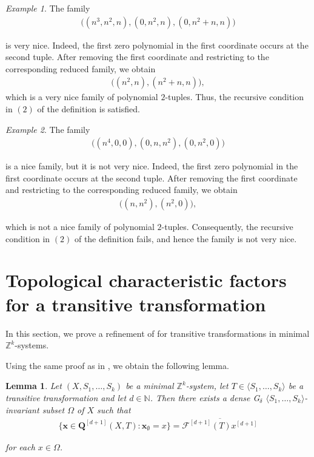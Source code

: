 \documentclass[11pt,reqno]{amsart}
\newcommand{\Z}{\mathbb{Z}}
\newcommand{\N}{\mathbb{N}}
\newcommand{\bQ}{\bm{Q}}
\newcommand{\bx}{{\boldsymbol x}}
\newcommand{\cF}{{\mathcal F}}
\newtheorem{lemma}[lemma]{Lemma}
\theoremstyle{definition}
\theoremstyle{remark}
\newtheorem{example}[example]{Example}
\begin{document}
\begin{example}
    The family \begin{align*}
    \big( (n^3,n^2,n),(0,n^2,n),(0,n^2+n,n) \big)
\end{align*}

is very nice. Indeed, the first zero polynomial in the first coordinate occurs at the second tuple. After removing the first coordinate and restricting to the corresponding reduced family, we obtain
\begin{align*}
    \big(
        (n^2,n),
        (n^2+n,n)
    \big),
\end{align*}
which is a very nice family of polynomial $2$-tuples. Thus, the recursive condition in $(2)$ of the definition is satisfied.
\end{example}

\begin{example}
    The family\begin{align*}
        \big( (n^4,0,0),(0,n,n^2),(0,n^2,0) \big)
    \end{align*}

    is a nice family, but it is not very nice. Indeed, the first zero polynomial in the first coordinate occurs at the second tuple. After removing the first coordinate and restricting to the corresponding reduced family, we obtain\begin{align*}
        \big( (n,n^2),(n^2,0)\big),
    \end{align*}

    which is not a nice family of polynomial $2$-tuples. Consequently, the recursive condition in $(2)$ of the definition fails, and hence the family is not very nice.
\end{example}

\section{Topological characteristic factors for a transitive transformation}

In this section, we prove a refinement of {\cite[Theorem 4.2]{Glasner_Huang_Shao_Weiss_Ye_Topological_characteristic_factors:2020}} for transitive transformations in minimal $\mathbb{Z}^k$-systems.

Using the same proof as in {\cite[Theorem 4.16]{Glasner_Gutman_Ye_higher_regionallyproximal_general_groups:2018}}, we obtain the following lemma.

\begin{lemma}\label{lemma: Qd_x_Fdx}
    Let $(X,S_1,\dots,S_k)$ be a minimal $\Z^k$-system, let $T\in \langle S_1,\dots,S_k \rangle$ be a transitive transformation and let $d\in \N$. Then there exists a dense G$_\delta$ $\langle S_1,\dots,S_k\rangle$-invariant subset $\Omega$ of $X$ such that\begin{align*}
        \{\bx\in \bQ^{[d+1]}(X,T): \bx_\emptyset = x\} = \overline{\cF^{[d+1]}(T)x^{[d+1]}}
    \end{align*}

    for each $x\in \Omega$.
\end{lemma}
\end{document}
